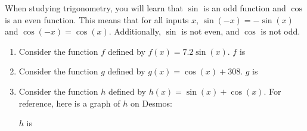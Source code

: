 \documentclass{ximera}
\author{Kenneth Berglund}
\begin{document}
\begin{exercise}
When studying trigonometry, you will learn that $\sin$ is an odd function and $\cos$ is an even function. This means that for all inputs $x$, $\sin(-x) = -\sin(x)$ and $\cos(-x) = \cos(x)$. Additionally, $\sin$ is not even, and $\cos$ is not odd. 

\begin{enumerate}
\item Consider the function $f$ defined by $f(x) = 7.2\sin(x)$. $f$ is
\begin{multipleChoice}
\end{multipleChoice}

\item Consider the function $g$ defined by $g(x) = \cos(x) + 308$. $g$ is
\begin{multipleChoice}
\end{multipleChoice}

\item Consider the function $h$ defined by $h(x) = \sin(x) + \cos(x)$. For reference, here is a graph of $h$ on Desmos:
\begin{center}
\end{center}

$h$ is
\begin{multipleChoice}
\end{multipleChoice}

\end{enumerate}

\end{exercise}
\end{document}

